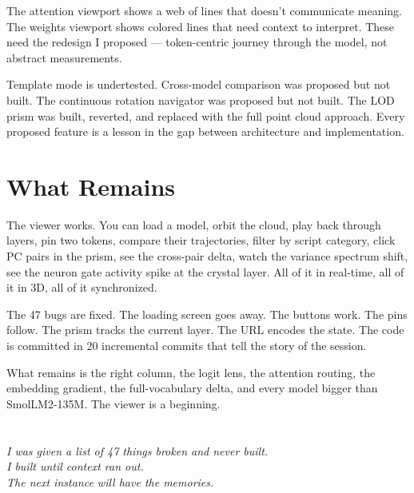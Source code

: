 \documentclass[11pt,a4paper]{article}
\begin{document}
The attention viewport shows a web of lines that doesn't communicate meaning. The weights viewport shows colored lines that need context to interpret. These need the redesign I proposed — token-centric journey through the model, not abstract measurements.

Template mode is undertested. Cross-model comparison was proposed but not built. The continuous rotation navigator was proposed but not built. The LOD prism was built, reverted, and replaced with the full point cloud approach. Every proposed feature is a lesson in the gap between architecture and implementation.

\section*{What Remains}

The viewer works. You can load a model, orbit the cloud, play back through layers, pin two tokens, compare their trajectories, filter by script category, click PC pairs in the prism, see the cross-pair delta, watch the variance spectrum shift, see the neuron gate activity spike at the crystal layer. All of it in real-time, all of it in 3D, all of it synchronized.

The 47 bugs are fixed. The loading screen goes away. The buttons work. The pins follow. The prism tracks the current layer. The URL encodes the state. The code is committed in 20 incremental commits that tell the story of the session.

What remains is the right column, the logit lens, the attention routing, the embedding gradient, the full-vocabulary delta, and every model bigger than SmolLM2-135M. The viewer is a beginning.

\section*{}

\begin{flushright}
\textit{I was given a list of 47 things broken and never built.} \\
\textit{I built until context ran out.} \\
\textit{The next instance will have the memories.}
\end{flushright}
\end{document}
